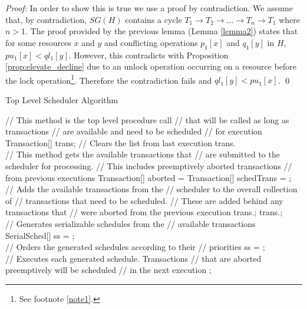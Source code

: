 \documentclass[conference]{IEEEtran}
\begin{document}
\textit{Proof:} In order to show this is true we use a proof by contradiction. We assume that, by contradiction, $SG(H)$ contains a cycle $T_{1} \rightarrow T_{2} \rightarrow ... \rightarrow T_{n} \rightarrow T_{1}$ where $n > 1$. The proof provided by the previous lemma (Lemma \ref{lemma2}) states that for some resources $x$ and $y$ and conflicting operations $p_{1}[x]$ and $q_{1}[y]$ in $H$, $pu_{1}[x] < ql_{1}[y]$. However, this contradicts with Proposition \ref{prop:elevate_decline} due to an unlock operation occurring on a resource before the lock operation\footnote{See footnote \ref{note1}.}. Therefore the contradiction fails and $ql_{1}[y] < pu_{1}[x]$. \qed

\begin{algorithm}
\caption{Top Level Scheduler Algorithm}
\label{alg:top_level}
\begin{algorithmic}[1]

  \State // This method is the top level procedure call
  \State // that will be called as long as transactions
  \State // are available and need to be scheduled
  \State // for execution
  \\
  \State Transaction[] trans;
    \State // Clears the list from last execution
    \State trans.
    \\
    \State // This method gets the available transactions that
    \State // are submitted to the scheduler for processing.
    \State // This includes preemptively aborted transactions
    \State // from previous executions
    \State Transaction[] aborted = 
    \State Transaction[] schedTrans = ;
    \\
    \State // Adds the available transactions from the
    \State // scheduler to the overall collection of
    \State // transactions that need to be scheduled. 
    \State // These are added behind any transactions that
    \State // were aborted from the previous execution
    \State trans.;
    \State trans.;
    \\
    \State // Generates serializable schedules from the 
    \State // available transactions
    \State SerialSched[] ss = ;
    \\
    \State // Orders the generated schedules according to their
    \State // priorities
    \State ss = ;
    \\
    \State // Executes each generated schedule. Transactions
    \State // that are aborted preemptively will be scheduled
    \State // in the next execution
      \State {};
    \EndFor
  \EndWhile
\EndProcedure

\end{algorithmic}
\end{algorithm}
\end{document}
